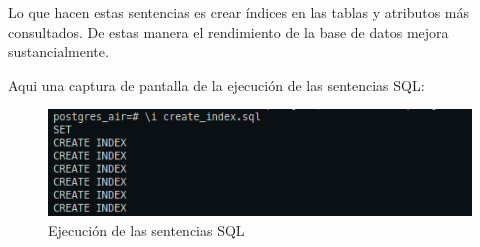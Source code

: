 \documentclass[11pt]{report}
\begin{document}
Lo que hacen estas sentencias es crear índices en las tablas y atributos más consultados. De estas
manera el rendimiento de la base de datos mejora sustancialmente. 

Aqui una captura de pantalla de la ejecución de las sentencias SQL:
\begin{figure}[H]
  \centering
  \includegraphics[scale=0.65]{img/ejecucion_create_index.png}
  \caption{Ejecución de las sentencias SQL}
  \label{fig:ejecución de las sentencias SQL}
\end{figure}

\cleardoublepage

\end{document}
